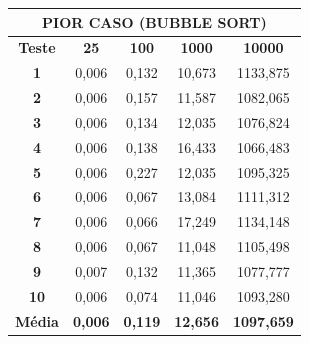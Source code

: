 \documentclass[a4paper, 12pt]{article}
\begin{document}
\begin{minipage}{1.0\textwidth}
  \begin{minipage}[c]{0.49\textwidth}
  \centering
\begin{tabular}{ccccc}
                          \multicolumn{ 5}{c}{{\bf PIOR CASO (BUBBLE SORT)}} \\
\hline
{\bf Teste} &  {\bf 25} & {\bf 100} & {\bf 1000} & {\bf 10000} \\
\hline
   {\bf 1} &      0,006 &      0,132 &     10,673 &   1133,875 \\
\hline
   {\bf 2} &      0,006 &      0,157 &     11,587 &   1082,065 \\
\hline
   {\bf 3} &      0,006 &      0,134 &     12,035 &   1076,824 \\
\hline
   {\bf 4} &      0,006 &      0,138 &     16,433 &   1066,483 \\
\hline
   {\bf 5} &      0,006 &      0,227 &     12,035 &   1095,325 \\
\hline
   {\bf 6} &      0,006 &      0,067 &     13,084 &   1111,312 \\
\hline
   {\bf 7} &      0,006 &      0,066 &     17,249 &   1134,148 \\
\hline
   {\bf 8} &      0,006 &      0,067 &     11,048 &   1105,498 \\
\hline
   {\bf 9} &      0,007 &      0,132 &     11,365 &   1077,777 \\
\hline
  {\bf 10} &      0,006 &      0,074 &     11,046 &   1093,280 \\
\hline
{\bf Média} & {\bf 0,006} & {\bf 0,119} & {\bf 12,656} & {\bf 1097,659} \\
\hline
\end{tabular} 

  \end{minipage}
 \hfill
 \begin{minipage}[c]{0.49\textwidth}
 \centering
{}

\end{minipage}
\end{minipage}
\end{document}
